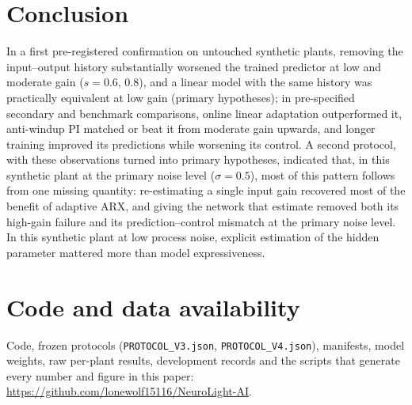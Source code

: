 \documentclass[11pt]{article}
\begin{document}
\section{Conclusion}
In a first pre-registered confirmation on untouched synthetic plants, removing the input--output history substantially worsened the trained predictor at low and moderate gain ($s=0.6$, $0.8$), and a linear model with the same history was practically equivalent at low gain (primary hypotheses); in pre-specified secondary and benchmark comparisons, online linear adaptation outperformed it, anti-windup PI matched or beat it from moderate gain upwards, and longer training improved its predictions while worsening its control. A second protocol, with these observations turned into primary hypotheses, indicated that, in this synthetic plant at the primary noise level ($\sigma=0.5$), most of this pattern follows from one missing quantity: re-estimating a single input gain recovered most of the benefit of adaptive ARX, and giving the network that estimate removed both its high-gain failure and its prediction--control mismatch at the primary noise level. In this synthetic plant at low process noise, explicit estimation of the hidden parameter mattered more than model expressiveness.

\section*{Code and data availability}
Code, frozen protocols (\texttt{PROTOCOL\_V3.json}, \texttt{PROTOCOL\_V4.json}), manifests, model weights, raw per-plant results, development records and the scripts that generate every number and figure in this paper: \url{https://github.com/lonewolf15116/NeuroLight-AI}.
\end{document}
